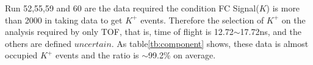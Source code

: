 Run 52,55,59 and 60 are the data required the condition FC Signal($K$) is more than 2000 in taking data to get $K^{+}$ events.
Therefore the selection of $K^{+}$ on the analysis required by only TOF, that is, time of flight is 12.72$\sim$17.72ns, and the others are defined $uncertain$.
As table\ref{tb:component} shows, these data is almost occupied $K^{+}$ events and the ratio is $\sim$99.2\% on average.
